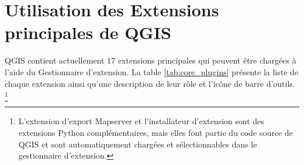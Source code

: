 
\section{Utilisation des Extensions principales de QGIS}\label{sec:core_plugins}



QGIS contient actuellement 17 extensions principales qui peuvent \^etre charg\'ees \`a l'aide du Gestionnaire d'extension.
La table \ref{tab:core_plugins} pr\'esente la liste de chaque extension ainsi qu'une 
description de leur r\^ole et l'ic\^one de barre d'outils. \footnote{L'extension d'export 
Mapserver et l'installateur d'extension sont des extensions Python compl\'ementaires, 
mais elles font partie du code source de QGIS et sont automatiquement charg\'ees et s\'electionnables 
dans le gestionnaire d'extension.}


